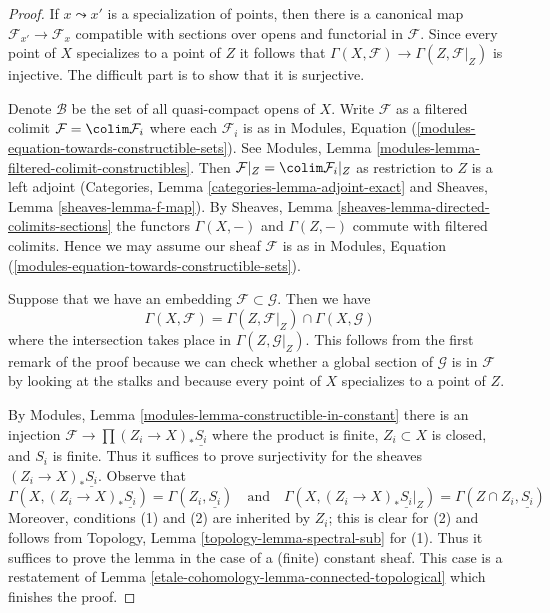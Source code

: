 \begin{proof}
If $x \leadsto x'$ is a specialization of points, then there is a
canonical map $\mathcal{F}_{x'} \to \mathcal{F}_x$ compatible with
sections over opens and functorial in $\mathcal{F}$. Since every point
of $X$ specializes to a point of $Z$ it follows that
$\Gamma(X, \mathcal{F}) \to \Gamma(Z, \mathcal{F}|_Z)$ is injective.
The difficult part is to show that it is surjective.

\medskip\noindent
Denote $\mathcal{B}$ be the set of all quasi-compact opens of $X$.
Write $\mathcal{F}$ as a filtered colimit $\mathcal{F} = \colim \mathcal{F}_i$
where each $\mathcal{F}_i$ is as in
Modules, Equation (\ref{modules-equation-towards-constructible-sets}).
See Modules, Lemma \ref{modules-lemma-filtered-colimit-constructibles}.
Then $\mathcal{F}|_Z = \colim \mathcal{F}_i|_Z$ as restriction to $Z$
is a left adjoint (Categories, Lemma \ref{categories-lemma-adjoint-exact} and
Sheaves, Lemma \ref{sheaves-lemma-f-map}).
By Sheaves, Lemma \ref{sheaves-lemma-directed-colimits-sections}
the functors $\Gamma(X, -)$ and $\Gamma(Z, -)$ commute with filtered colimits.
Hence we may assume our sheaf $\mathcal{F}$ is as in
Modules, Equation (\ref{modules-equation-towards-constructible-sets}).

\medskip\noindent
Suppose that we have an embedding $\mathcal{F} \subset \mathcal{G}$.
Then we have
$$
\Gamma(X, \mathcal{F}) =
\Gamma(Z, \mathcal{F}|_Z) \cap \Gamma(X, \mathcal{G})
$$
where the intersection takes place in $\Gamma(Z, \mathcal{G}|_Z)$.
This follows from the first remark of the proof because we can check
whether a global section of $\mathcal{G}$ is in $\mathcal{F}$ by looking
at the stalks and because every point of $X$ specializes to a point of $Z$.

\medskip\noindent
By Modules, Lemma \ref{modules-lemma-constructible-in-constant}
there is an injection $\mathcal{F} \to \prod (Z_i \to X)_*\underline{S_i}$
where the product is finite, $Z_i \subset X$ is closed, and $S_i$ is finite.
Thus it suffices to prove surjectivity for the sheaves
$(Z_i \to X)_*\underline{S_i}$. Observe that
$$
\Gamma(X, (Z_i \to X)_*\underline{S_i}) = \Gamma(Z_i, \underline{S_i})
\quad\text{and}\quad
\Gamma(X, (Z_i \to X)_*\underline{S_i}|_Z) =
\Gamma(Z \cap Z_i, \underline{S_i})
$$
Moreover, conditions (1) and (2) are inherited by $Z_i$; this is clear
for (2) and follows from
Topology, Lemma \ref{topology-lemma-spectral-sub} for (1). Thus it
suffices to prove the lemma in the case of a (finite) constant sheaf.
This case is a restatement of Lemma \ref{etale-cohomology-lemma-connected-topological}
which finishes the proof.
\end{proof}


